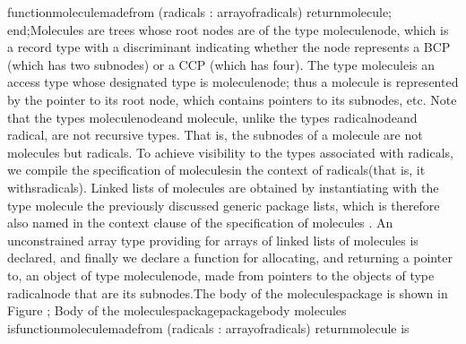    \tyxtstxbf[]function\tyxtstxendbf[] molecule\Symuns[]made\Symuns[]from (radicals : array\Symuns[]of\Symuns[]radicals)
      \tyxtstxbf[]return\tyxtstxendbf[] molecule;
\tyxtstxbf[]end\tyxtstxendbf[];\Endcomp[]
\EndParbox[]
\FgEndblock[]
\TyPbrkNewp[]
 Molecules are trees whose root nodes are of the type %
\tyxffmxmono[]molecule\Symuns[]node\tyxffmxendmono[], which is a record
type with a discriminant indicating whether the node represents a
BCP (which has two subnodes) or a CCP (which has four). The type %
\tyxffmxmono[]molecule\tyxffmxendmono[] is an access type whose designated
type is \tyxffmxmono[]molecule\Symuns[]node\tyxffmxendmono[]; thus
a molecule is represented by the pointer to its root node, which contains
pointers to its subnodes, etc. Note that the types %
\tyxffmxmono[]molecule\Symuns[]node\tyxffmxendmono[] and %
\tyxffmxmono[]molecule\tyxffmxendmono[], unlike the types %
\tyxffmxmono[]radical\Symuns[]node\tyxffmxendmono[] and %
\tyxffmxmono[]radical\tyxffmxendmono[], are not recursive types. That
is, the subnodes of a molecule are not molecules but radicals. To
achieve visibility to the types associated with radicals, we compile
the specification of \tyxffmxmono[]molecules\tyxffmxendmono[] in the
context of \tyxffmxmono[]radicals\tyxffmxendmono[] (that is, it \ldquo[]withs\rdquo[]
\tyxffmxmono[]radicals\tyxffmxendmono[]). Linked lists of molecules
are obtained by instantiating with the type \tyxffmxmono[]molecule%
\tyxffmxendmono[] the previously discussed generic package %
\tyxffmxmono[]lists\tyxffmxendmono[], which is therefore also named
in the context clause of the specification of \tyxffmxmono[]molecules%
\tyxffmxendmono[]. An unconstrained array type providing for arrays
of linked lists of molecules is declared, and finally we declare a
function for allocating, and returning a pointer to, an object of
type \tyxffmxmono[]molecule\Symuns[]node\tyxffmxendmono[], made from
pointers to the objects of type \tyxffmxmono[]radical\Symuns[]node%
\tyxffmxendmono[] that are its subnodes.\Endpara[]
\Para[]The body of the \tyxffmxmono[]molecules\tyxffmxendmono[] package
is shown in Figure ;
\Parbox[]
Body of the %
\tyxffmxmono[]molecules\tyxffmxendmono[] package\FgEndcap[]
\Comp[]\tyxtstxbf[]package\tyxtstxendbf[] \tyxtstxbf[]body%
\tyxtstxendbf[] molecules \tyxtstxbf[]is\tyxtstxendbf[]
   \tyxtstxbf[]function\tyxtstxendbf[] molecule\Symuns[]made\Symuns[]from (radicals : array\Symuns[]of\Symuns[]radicals)
      \tyxtstxbf[]return\tyxtstxendbf[] molecule \tyxtstxbf[]is%
